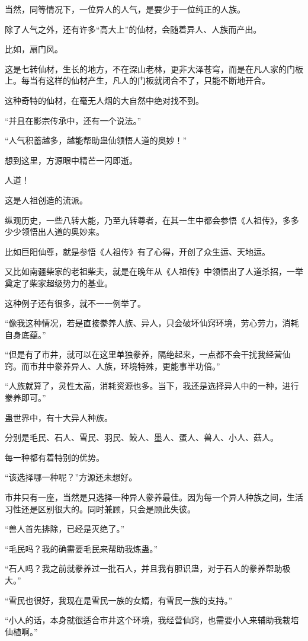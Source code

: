 \begin{this_body}
当然，同等情况下，一位异人的人气，是要少于一位纯正的人族。

除了人气之外，还有许多“高大上”的仙材，会随着异人、人族而产出。

比如，扇门风。

这是七转仙材，生长的地方，不在深山老林，更非大泽苍穹，而是在凡人家的门板上。每当有这样的仙材产生，凡人的门板就闭合不了，只能不断地开合。

这种奇特的仙材，在毫无人烟的大自然中绝对找不到。

“并且在影宗传承中，还有一个说法。”

“人气积蓄越多，越能帮助蛊仙领悟人道的奥妙！”

想到这里，方源眼中精芒一闪即逝。

人道！

这是人祖创造的流派。

纵观历史，一些八转大能，乃至九转尊者，在其一生中都会参悟《人祖传》，多多少少领悟出人道的奥妙来。

比如巨阳仙尊，就是参悟《人祖传》有了心得，开创了众生运、天地运。

又比如南疆柴家的老祖柴夫，就是在晚年从《人祖传》中领悟出了人道杀招，一举奠定了柴家超级势力的基业。

这种例子还有很多，就不一一例举了。

“像我这种情况，若是直接豢养人族、异人，只会破坏仙窍环境，劳心劳力，消耗自身底蕴。”

“但是有了市井，就可以在这里单独豢养，隔绝起来，一点都不会干扰我经营仙窍。而市井中豢养异人、人族，环境特殊，更能事半功倍。”

“人族就算了，灵性太高，消耗资源也多。当下，我还是选择异人中的一种，进行豢养即可。”

蛊世界中，有十大异人种族。

分别是毛民、石人、雪民、羽民、鲛人、墨人、蛋人、兽人、小人、菇人。

每一种都有着特别的优势。

“该选择哪一种呢？”方源还未想好。

市井只有一座，当然是只选择一种异人豢养最佳。因为每一个异人种族之间，生活习性还是区别很大的。同时兼顾，只会是顾此失彼。

“兽人首先排除，已经是灭绝了。”

“毛民吗？我的确需要毛民来帮助我炼蛊。”

“石人吗？我之前就豢养过一批石人，并且我有胆识蛊，对于石人的豢养帮助极大。”

“雪民也很好，我现在是雪民一族的女婿，有雪民一族的支持。”

“小人的话，本身就很适合市井这个环境，我经营仙窍，也需要小人来辅助我栽培仙植啊。”


\end{this_body}
